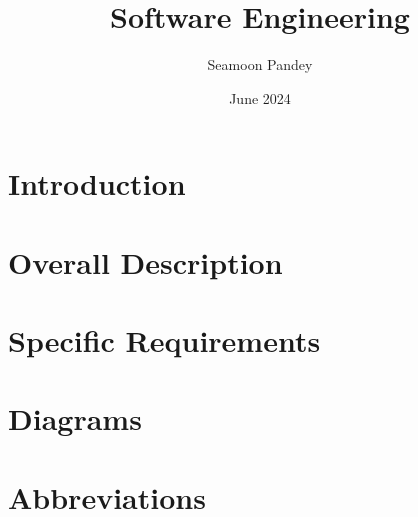 \documentclass[a4paper,12pt]{report}
\title{Software Engineering}
\author{Seamoon Pandey}
\date{June 2024}
\begin{document}



\tableofcontents
\thispagestyle{empty}
\addtocounter{page}{-1}
\newpage





\chapter{Introduction}%
\label{introduction}%

\newpage

\chapter{Overall Description}%
\label{description}%

\newpage

\chapter{Specific Requirements}%
\label{requirements}

\newpage
\chapter{Diagrams}%
\label{diagrams}

\newpage

\chapter*{Abbreviations}%
%
\label{abbreviations}%

\end{document}
